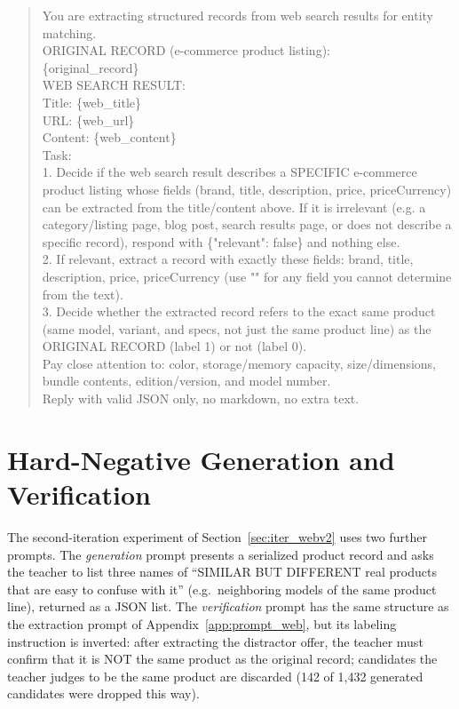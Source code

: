 \documentclass[a4paper,oneside,bibliography=totoc]{scrbook}
\begin{document}
\begin{quote}\small\ttfamily\raggedright
You are extracting structured records from web search results for entity matching.\\[4pt]
ORIGINAL RECORD (e-commerce product listing):\\
\{original\_record\}\\[4pt]
WEB SEARCH RESULT:\\
Title: \{web\_title\}\\
URL: \{web\_url\}\\
Content: \{web\_content\}\\[4pt]
Task:\\
1. Decide if the web search result describes a SPECIFIC e-commerce product listing whose fields (brand, title, description, price, priceCurrency) can be extracted from the title/content above. If it is irrelevant (e.g. a category/listing page, blog post, search results page, or does not describe a specific record), respond with \{"relevant": false\} and nothing else.\\
2. If relevant, extract a record with exactly these fields: brand, title, description, price, priceCurrency (use "" for any field you cannot determine from the text).\\
3. Decide whether the extracted record refers to the exact same product (same model, variant, and specs, not just the same product line) as the ORIGINAL RECORD (label 1) or not (label 0).\\
Pay close attention to: color, storage/memory capacity, size/dimensions, bundle contents, edition/version, and model number.\\[4pt]
Reply with valid JSON only, no markdown, no extra text.
\end{quote}

\section{Hard-Negative Generation and Verification}
\label{app:prompt_hardneg}

The second-iteration experiment of Section~\ref{sec:iter_webv2} uses two further prompts. The \emph{generation} prompt presents a serialized product record and asks the teacher to list three names of ``SIMILAR BUT DIFFERENT real products that are easy to confuse with it'' (e.g.\ neighboring models of the same product line), returned as a JSON list. The \emph{verification} prompt has the same structure as the extraction prompt of Appendix~\ref{app:prompt_web}, but its labeling instruction is inverted: after extracting the distractor offer, the teacher must confirm that it is NOT the same product as the original record; candidates the teacher judges to be the same product are discarded (142 of 1{,}432 generated candidates were dropped this way).
\end{document}
